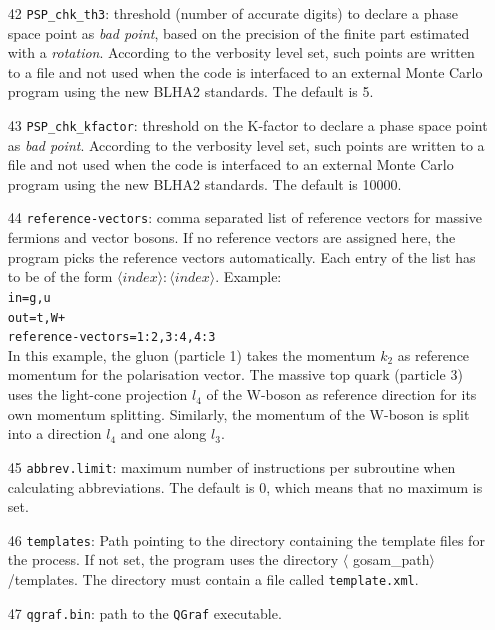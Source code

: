 \documentclass[11pt,a4paper]{refrep}
\begin{document}
\begin{enumerate}
\item[42] \texttt{PSP\_chk\_th3}:  threshold (number of accurate digits) to declare a 
phase space point  as {\it bad point}, based on the precision of 
    the finite part estimated with a {\it rotation}. According to the     
    verbosity level set, such points are written to a file and not  
    used when the code is interfaced to an external Monte Carlo program 
    using the new BLHA2 standards.           
 The default is 5. 
\item[43] \texttt{PSP\_chk\_kfactor}: threshold on the K-factor to declare a 
phase space point  as {\it bad point}. According 
to the verbosity level set, such points are written to a file and 
    not used when the code is interfaced to an external Monte Carlo program 
    using the new BLHA2 standards.                    
The default is 10000.
\item[44] \texttt{reference-vectors}: comma separated list of  reference vectors for massive 
fermions and vector bosons.
If no reference vectors are assigned here, the program picks the reference vectors automatically. 
Each entry of the list has to be of the form $\langle index\rangle :\langle index\rangle $.  
Example: \\
{\tt in=g,u}\\                                                       
{\tt out=t,W+ }\\                                                       
{\tt reference-vectors=1:2,3:4,4:3 }\\                                  
    In this example, the gluon (particle 1) takes the momentum $k_2$   
    as reference momentum for the polarisation vector. The massive  
    top quark (particle 3) uses the light-cone projection $l_4$ of the
    W-boson as reference direction for its own momentum splitting.  
    Similarly, the momentum of the W-boson is split into a direction
    $l_4$ and one along $l_3$.                                            
\item[45] \texttt{abbrev.limit}: maximum number of instructions per subroutine when calculating  
 abbreviations. The default is 0, which means that no maximum is set.
\item[46] \texttt{templates}:   Path pointing to the directory containing the template 
    files for the process. If not set, the program uses the directory      
    $\langle$ gosam\_path$\rangle$/templates.                                         
    The directory must contain a file called {\tt template.xml}.
\item[47] \texttt{qgraf.bin}: path to the {\tt QGraf} executable.  

\end{enumerate}
\end{document}

